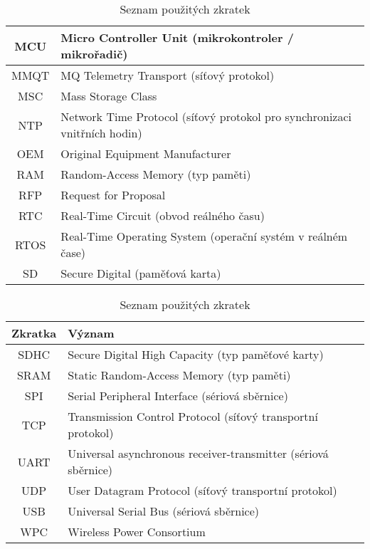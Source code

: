 \begin{table}[h]
\begin{tabular}{|c|l|}
MCU              & Micro Controller Unit (mikrokontroler / mikrořadič)              \\ \hline
MMQT             & MQ Telemetry Transport (síťový protokol)                         \\ \hline
MSC              & Mass Storage Class                                               \\ \hline
NTP              & Network Time Protocol (síťový protokol pro synchronizaci vnitřních hodin) \\ \hline
OEM              & Original Equipment Manufacturer                                  \\ \hline
RAM              & Random-Access Memory (typ paměti)                                \\ \hline
RFP              & Request for Proposal                                             \\ \hline
RTC              & Real-Time Circuit (obvod reálného času)                          \\ \hline
RTOS             & Real-Time Operating System (operační systém v reálném čase)      \\ \hline
SD               & Secure Digital (paměťová karta)                                  \\ \hline

\end{tabular}
\caption{Seznam použitých zkratek}
\label{tab:zkratky-1}
\end{table}


\begin{table}[h]
\centering
\renewcommand{\arraystretch}{1.3}
\begin{tabular}{|c|l|}
\hline
\textbf{Zkratka} & \textbf{Význam}                                                  \\ \hline
SDHC             & Secure Digital High Capacity (typ paměťové karty)                \\ \hline
SRAM             & Static Random-Access Memory (typ paměti)                         \\ \hline
SPI              & Serial Peripheral Interface (sériová sběrnice)                   \\ \hline
TCP              & Transmission Control Protocol (síťový transportní protokol)      \\ \hline
UART             & Universal asynchronous receiver-transmitter (sériová sběrnice)   \\ \hline
UDP              & User Datagram Protocol (síťový transportní protokol)             \\ \hline
USB              & Universal Serial Bus (sériová sběrnice)                          \\ \hline
WPC              & Wireless Power Consortium                                        \\ \hline

\end{tabular}
\caption{Seznam použitých zkratek}
\label{tab:zkratky-1}
\end{table}